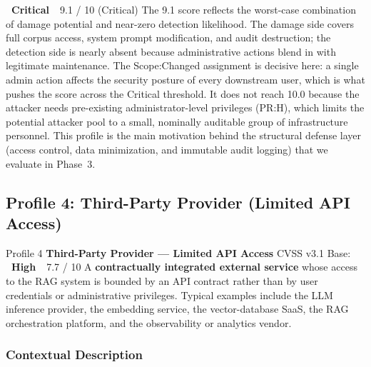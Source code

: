 \documentclass[11pt,a4paper]{report}
\newcommand{\badgecritical}{\colorbox{danger}{\color{white}\small\textbf{~Critical~}}}
\newcommand{\badgehigh}{\colorbox{warn}{\color{white}\small\textbf{~High~}}}
\begin{document}
\begin{cvssbox}{\badgecritical\ 9.1 / 10 (Critical)}
\small The 9.1 score reflects the worst-case combination of damage
potential and near-zero detection likelihood. The damage side covers
full corpus access, system prompt modification, and audit destruction;
the detection side is nearly absent because administrative actions
blend in with legitimate maintenance. The Scope:Changed assignment is
decisive here: a single admin action affects the security posture of
every downstream user, which is what pushes the score across the
Critical threshold. It does not reach 10.0 because the attacker needs
pre-existing administrator-level privileges (PR:H), which limits the
potential attacker pool to a small, nominally auditable group of
infrastructure personnel. This profile is the main motivation behind
the structural defense layer (access control, data minimization, and
immutable audit logging) that we evaluate in Phase~3.
\end{cvssbox}


\newpage
\subsection{Profile 4: Third-Party Provider (Limited API Access)}

\begin{profilebanner}%
  {Profile 4 \enspace\textbf{Third-Party Provider --- Limited API Access}}%
  {CVSS v3.1 Base: \badgehigh\ 7.7 / 10}
  \small
  A \textbf{contractually integrated external service} whose access to the
  RAG system is bounded by an API contract rather than by user credentials
  or administrative privileges. Typical examples include the LLM inference
  provider, the embedding service, the vector-database SaaS, the RAG
  orchestration platform, and the observability or analytics vendor.
\end{profilebanner}

\subsubsection{Contextual Description}
\end{document}
